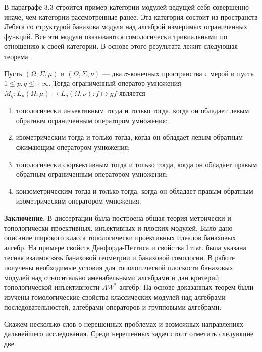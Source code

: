 В параграфе 3.3 строится пример категории модулей ведущей себя совершенно иначе,
чем категории рассмотренные ранее. Эта категория состоит из пространств Лебега
со структурой банахова модуля над алгеброй измеримых ограниченных функций. Все
эти модули оказываются гомологически тривиальными по отношению к своей
категории. В основе этого результата лежит следующая теорема.

\begin{theorem*}[3.3.12, 3.3.16, 3.3.19, 3.3.24] Пусть $(\Omega,\Sigma,\mu)$ и
    $(\Omega,\Sigma,\nu)$ --- два $\sigma$-конечных пространства с мерой и пусть
    $1\leq p, q\leq+\infty$. Тогда ограниченный оператор умножения
    $M_g:L_p(\Omega,\mu)\to L_q(\Omega,\nu):f\mapsto gf$ является
    \begin{enumerate}[label = (\roman*)]
        \item топологически инъективным тогда и только тогда, когда он обладает левым
              обратным ограниченным оператором умножения;

        \item изометрическим тогда и только тогда, когда он обладает левым обратным
              сжимающим оператором умножения;

        \item топологически сюръективным тогда и только тогда, когда он обладает правым
              обратным ограниченным оператором умножения;

        \item коизометрическим тогда и только тогда, когда он обладает правым обратным
              изометрическим оператором умножения.
    \end{enumerate}
\end{theorem*}

\textbf{Заключение.} В диссертации была построена общая теория метрически и
топологически проективных, инъективных и плоских модулей. Было дано описание
широкого класса топологически проективных идеалов банаховых алгебр. На примере
свойств Данфорда-Петтиса и свойства l.u.st. была указана тесная взаимосвязь
банаховой геометрии и банаховой гомологии. В работе получены необходимые условия
для топологической плоскости банаховых модулей над относительно аменабельными
алгебрами и дан критерий топологической инъективности $AW^*$-алгебр. На основе
доказанных теорем были изучены гомологические свойства классических модулей над
алгебрами последовательностей, алгебрами операторов и групповыми алгебрами.

Скажем несколько слов о нерешенных проблемах и возможных направлениях
дальнейшего исследования. Среди нерешенных задач стоит отметить следующие две.

